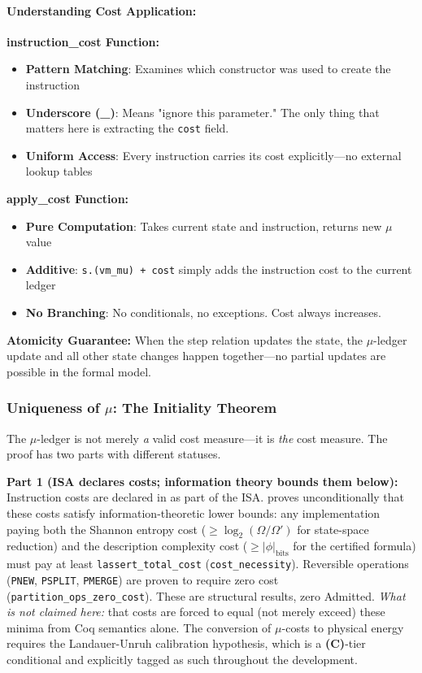 \paragraph{Understanding Cost Application:}
\textbf{instruction\_cost Function:}
\begin{itemize}
    \item \textbf{Pattern Matching}: Examines which constructor was used to create the instruction
    \item \textbf{Underscore (\_)}: Means "ignore this parameter." The only thing that matters here is extracting the \texttt{cost} field.
    \item \textbf{Uniform Access}: Every instruction carries its cost explicitly—no external lookup tables
\end{itemize}

\textbf{apply\_cost Function:}
\begin{itemize}
    \item \textbf{Pure Computation}: Takes current state and instruction, returns new $\mu$ value
    \item \textbf{Additive}: \texttt{s.(vm\_mu) + cost} simply adds the instruction cost to the current ledger
    \item \textbf{No Branching}: No conditionals, no exceptions. Cost always increases.
\end{itemize}

\textbf{Atomicity Guarantee:} When the step relation updates the state, the $\mu$-ledger update and all other state changes happen together—no partial updates are possible in the formal model.

\subsubsection{Uniqueness of $\mu$: The Initiality Theorem}

The $\mu$-ledger is not merely \emph{a} valid cost measure---it is \emph{the} cost measure. The proof has two parts with different statuses.

\textbf{Part 1 (ISA declares costs; information theory bounds them below):} Instruction costs are declared in  as part of the ISA.  proves unconditionally that these costs satisfy information-theoretic lower bounds: any implementation paying both the Shannon entropy cost ($\ge \log_2(\Omega/\Omega')$ for state-space reduction) and the description complexity cost ($\ge |\phi|_{\text{bits}}$ for the certified formula) must pay at least \texttt{lassert\_total\_cost} (\texttt{cost\_necessity}). Reversible operations (\texttt{PNEW}, \texttt{PSPLIT}, \texttt{PMERGE}) are proven to require zero cost (\texttt{partition\_ops\_zero\_cost}). These are structural results, zero Admitted. \emph{What is not claimed here:} that costs are forced to equal (not merely exceed) these minima from Coq semantics alone. The conversion of $\mu$-costs to physical energy requires the Landauer-Unruh calibration hypothesis, which is a \textbf{(C)}-tier conditional and explicitly tagged as such throughout the development.

